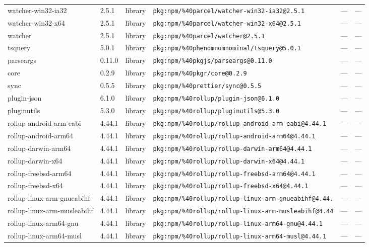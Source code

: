 \documentclass[11pt]{article}
\begin{document}
\begin{longtable}{|l|l|l|p{2.2cm}|l|p{4cm}|}
watcher-win32-ia32 & 2.5.1 & library & \texttt{pkg:npm/\%40parcel/watcher-win32-ia32@2.5.1} & — & — \\
watcher-win32-x64 & 2.5.1 & library & \texttt{pkg:npm/\%40parcel/watcher-win32-x64@2.5.1} & — & — \\
watcher & 2.5.1 & library & \texttt{pkg:npm/\%40parcel/watcher@2.5.1} & — & — \\
tsquery & 5.0.1 & library & \texttt{pkg:npm/\%40phenomnomnominal/tsquery@5.0.1} & — & — \\
parseargs & 0.11.0 & library & \texttt{pkg:npm/\%40pkgjs/parseargs@0.11.0} & — & — \\
core & 0.2.9 & library & \texttt{pkg:npm/\%40pkgr/core@0.2.9} & — & — \\
sync & 0.5.5 & library & \texttt{pkg:npm/\%40prettier/sync@0.5.5} & — & — \\
plugin-json & 6.1.0 & library & \texttt{pkg:npm/\%40rollup/plugin-json@6.1.0} & — & — \\
pluginutils & 5.3.0 & library & \texttt{pkg:npm/\%40rollup/pluginutils@5.3.0} & — & — \\
rollup-android-arm-eabi & 4.44.1 & library & \texttt{pkg:npm/\%40rollup/rollup-android-arm-eabi@4.44.1} & — & — \\
rollup-android-arm64 & 4.44.1 & library & \texttt{pkg:npm/\%40rollup/rollup-android-arm64@4.44.1} & — & — \\
rollup-darwin-arm64 & 4.44.1 & library & \texttt{pkg:npm/\%40rollup/rollup-darwin-arm64@4.44.1} & — & — \\
rollup-darwin-x64 & 4.44.1 & library & \texttt{pkg:npm/\%40rollup/rollup-darwin-x64@4.44.1} & — & — \\
rollup-freebsd-arm64 & 4.44.1 & library & \texttt{pkg:npm/\%40rollup/rollup-freebsd-arm64@4.44.1} & — & — \\
rollup-freebsd-x64 & 4.44.1 & library & \texttt{pkg:npm/\%40rollup/rollup-freebsd-x64@4.44.1} & — & — \\
rollup-linux-arm-gnueabihf & 4.44.1 & library & \texttt{pkg:npm/\%40rollup/rollup-linux-arm-gnueabihf@4.44.} & — & — \\
rollup-linux-arm-musleabihf & 4.44.1 & library & \texttt{pkg:npm/\%40rollup/rollup-linux-arm-musleabihf@4.44} & — & — \\
rollup-linux-arm64-gnu & 4.44.1 & library & \texttt{pkg:npm/\%40rollup/rollup-linux-arm64-gnu@4.44.1} & — & — \\
rollup-linux-arm64-musl & 4.44.1 & library & \texttt{pkg:npm/\%40rollup/rollup-linux-arm64-musl@4.44.1} & — & — \\

\end{longtable}
\end{document}
